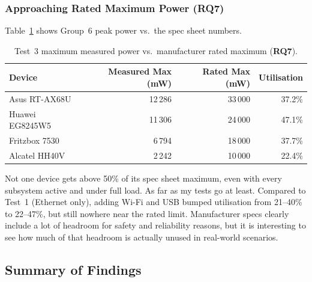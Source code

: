 \subsubsection*{Approaching Rated Maximum Power (RQ7)}
\label{sec:test3-rq7}

Table~\ref{tab:test3_rated} shows Group~6 peak power vs.\ the spec sheet numbers.

\begin{table}[H]
    \centering
    \caption{Test~3 maximum measured power vs.\ manufacturer rated maximum (\textbf{RQ7}).}
    \label{tab:test3_rated}
    \small\renewcommand{\arraystretch}{0.88}
    \begin{tabular}{l r r r}
        \toprule
        \textbf{Device} & \textbf{Measured Max (mW)} & \textbf{Rated Max (mW)} & \textbf{Utilisation} \\
        \midrule
        Asus RT-AX68U       & 12\,286 & 33\,000 & 37.2\% \\
        Huawei EG8245W5     & 11\,306 & 24\,000 & 47.1\% \\
        Fritzbox 7530       & 6\,794  & 18\,000 & 37.7\% \\
        Alcatel HH40V       & 2\,242  & 10\,000 & 22.4\% \\
        \bottomrule
    \end{tabular}
\end{table}

Not one device gets above 50\% of its spec sheet maximum, even with every subsystem active and under full load. As far as my tests go at least.
Compared to Test~1 (Ethernet only), adding Wi-Fi and \ac{USB} bumped utilisation from 21--40\% to 22--47\%, but still nowhere near the rated limit. Manufacturer specs clearly include a lot of headroom for safety and reliability reasons, but it is interesting to see how much of that headroom is actually unused in real-world scenarios.

\subsection{Summary of Findings}
\label{sec:test3-summary}


